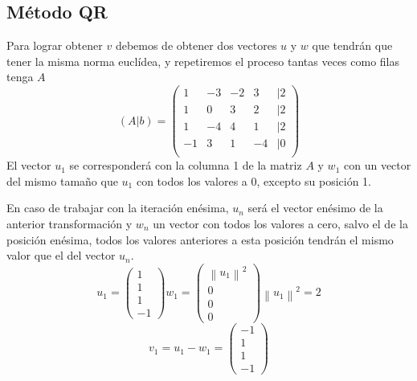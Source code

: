 \subsection{Método QR}
Para lograr obtener \(v\) debemos de obtener dos vectores \(u\) y \(w\) que tendrán que tener la misma norma euclídea, y repetiremos el proceso tantas veces como filas tenga \(A\)
\[
        (A|b) = \begin{pmatrix}
                1  & -3 & -2 & 3  & |2  \\
                1  & 0  & 3  & 2  & | 2 \\
                1  & -4 & 4  & 1  & | 2 \\
                -1 & 3  & 1  & -4 & | 0 \\
        \end{pmatrix}
\]
El vector \(u_1\) se corresponderá con la columna 1 de la matriz \(A\) y \(w_1\) con un vector del mismo tamaño que \(u_1\) con todos los valores a 0, excepto su posición 1.
\par En caso de trabajar con la iteración enésima, \(u_n\) será el vector enésimo de la anterior transformación y \(w_n\) un vector con todos los valores a cero, salvo el de la posición enésima, todos los valores anteriores a esta posición tendrán el mismo valor que el del vector \(u_n\).
\[
        u_1 = \begin{pmatrix}
                1 \\
                1 \\
                1 \\
                -1
        \end{pmatrix}
        w_1 = \begin{pmatrix}
                \left \| u_1 \right \|^2 \\
                0                        \\
                0                        \\
                0
        \end{pmatrix}
        \left \| u_1 \right \|^2 = 2
\]
\[
        v_1 = u_1 - w_1 = \begin{pmatrix}
                -1 \\
                1  \\
                1  \\
                -1
        \end{pmatrix}
\]
